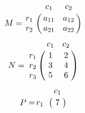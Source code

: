 \documentclass{article}
\begin{document}
\[ M=\bordermatrix{ & c_1 & c_2 \cr r_1 & a_{11} & a_{12} \cr r_2 & a_{21} & a_{22} \cr} \]
\[ N=\bordermatrix{ & c_1 & c_2 \cr r_1 & 1 & 2 \cr r_2 & 3 & 4 \cr r_3 & 5 & 6 \cr} \]
\[ P=\bordermatrix{ & c_1 \cr r_1 & 7 \cr} \]
\end{document}

